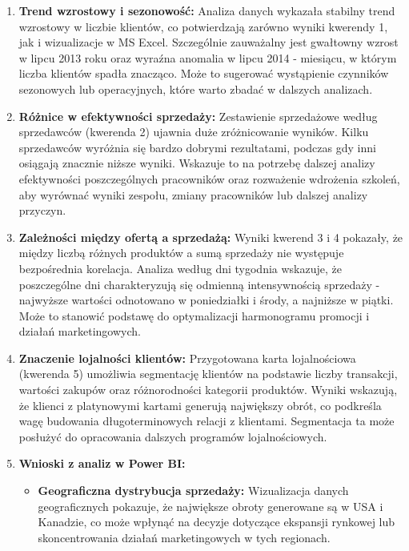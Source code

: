 \documentclass[a4paper,12pt]{article}
\begin{document}
\begin{enumerate}
    \item \textbf{Trend wzrostowy i sezonowość:}  
    Analiza danych wykazała stabilny trend wzrostowy w liczbie klientów, co potwierdzają zarówno wyniki kwerendy 1, jak i wizualizacje w MS Excel. Szczególnie zauważalny jest gwałtowny wzrost w lipcu 2013 roku oraz wyraźna anomalia w lipcu 2014 - miesiącu, w którym liczba klientów spadła znacząco. Może to sugerować wystąpienie czynników sezonowych lub operacyjnych, które warto zbadać w dalszych analizach.

    \item \textbf{Różnice w efektywności sprzedaży:}  
    Zestawienie sprzedażowe według sprzedawców (kwerenda 2) ujawnia duże zróżnicowanie wyników. Kilku sprzedawców wyróżnia się bardzo dobrymi rezultatami, podczas gdy inni osiągają znacznie niższe wyniki. Wskazuje to na potrzebę dalszej analizy efektywności poszczególnych pracowników oraz rozważenie wdrożenia szkoleń, aby wyrównać wyniki zespołu, zmiany pracowników lub dalszej analizy przyczyn.

    \item \textbf{Zależności między ofertą a sprzedażą:}
    Wyniki kwerend 3 i 4 pokazały, że między liczbą różnych produktów a sumą sprzedaży nie występuje bezpośrednia korelacja. Analiza według dni tygodnia wskazuje, że poszczególne dni charakteryzują się odmienną intensywnością sprzedaży - najwyższe wartości odnotowano w poniedziałki i środy, a najniższe w piątki. Może to stanowić podstawę do optymalizacji harmonogramu promocji i działań marketingowych.

    \item \textbf{Znaczenie lojalności klientów:}
    Przygotowana karta lojalnościowa (kwerenda 5) umożliwia segmentację klientów na podstawie liczby transakcji, wartości zakupów oraz różnorodności kategorii produktów. Wyniki wskazują, że klienci z platynowymi kartami generują największy obrót, co podkreśla wagę budowania długoterminowych relacji z klientami. Segmentacja ta może posłużyć do opracowania dalszych programów lojalnościowych.

    \item \textbf{Wnioski z analiz w Power BI:}  
    \begin{itemize}
        \item \textbf{Geograficzna dystrybucja sprzedaży:}
        Wizualizacja danych geograficznych pokazuje, że największe obroty generowane są w USA i Kanadzie, co może wpłynąć na decyzje dotyczące ekspansji rynkowej lub skoncentrowania działań marketingowych w tych regionach.
        

\end{itemize}
\end{enumerate}
\end{document}
